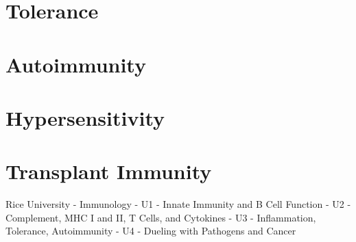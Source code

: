 \documentclass[10pt]{article}
\begin{document}
\section{Tolerance}

\section{Autoimmunity}

\section{Hypersensitivity}

\section{Transplant Immunity}

Rice University - Immunology
- U1 - Innate Immunity and B Cell Function
- U2 - Complement, MHC I and II, T Cells, and Cytokines
- U3 - Inflammation, Tolerance, Autoimmunity
- U4 - Dueling with Pathogens and Cancer
  
\end{document}
